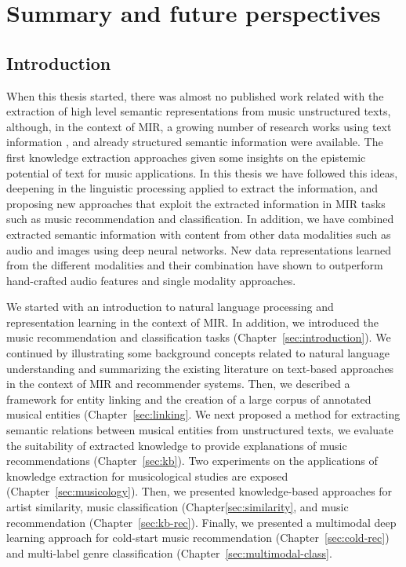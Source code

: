 
\chapter{Summary and future perspectives}
\label{sec:conclusion}

\section{Introduction}

When this thesis started, there was almost no published work related with the extraction of high level semantic representations from music unstructured texts, although, in the context of MIR, a growing number of research works using text information \cite{}, and already structured semantic information \cite{} were available. The first knowledge extraction approaches \cite{Tata2010,Knees2011,Sordo2012} given some insights on the epistemic potential of text for music applications. In this thesis we have followed this ideas, deepening in the linguistic processing applied to extract the information, and proposing new approaches that exploit the extracted information in MIR tasks such as music recommendation and classification. In addition, we have combined extracted semantic information with content from other data modalities such as audio and images using deep neural networks. New data representations learned from the different modalities and their combination have shown to outperform hand-crafted audio features and single modality approaches.

We started with an introduction to natural language processing and representation learning in the context of MIR. In addition, we introduced the music recommendation and classification tasks (Chapter~\ref{sec:introduction}). We continued by illustrating some background concepts related to natural language understanding and summarizing the existing literature on text-based approaches in the context of MIR and recommender systems. Then, we described a framework for entity linking and the creation of a large corpus of annotated musical entities (Chapter~\ref{sec:linking}. We next proposed a method for extracting semantic relations between musical entities from unstructured texts, we evaluate the suitability of extracted knowledge to provide explanations of music recommendations (Chapter~\ref{sec:kb}). Two experiments on the applications of knowledge extraction for musicological studies are exposed (Chapter~\ref{sec:musicology}). Then, we presented knowledge-based approaches for artist similarity, music classification (Chapter\ref{sec:similarity}, and music recommendation (Chapter~\ref{sec:kb-rec}). Finally, we presented a multimodal deep learning approach for cold-start music recommendation (Chapter~\ref{sec:cold-rec}) and multi-label genre classification (Chapter~\ref{sec:multimodal-class}.

